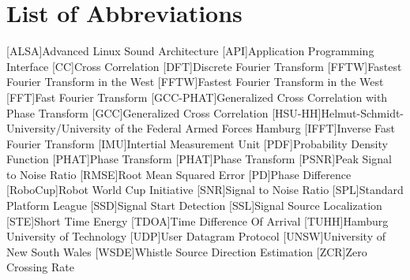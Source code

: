 \chapter*{List of Abbreviations}
\label{sec:abbreviations}

\begin{acronym}\itemsep0pt
  [ALSA]{Advanced Linux Sound Architecture}
  [API]{Application Programming Interface}
  [CC]{Cross Correlation}
  [DFT]{Discrete Fourier Transform}
  [FFTW]{Fastest Fourier Transform in the West}
  [FFTW]{Fastest Fourier Transform in the West}
  [FFT]{Fast Fourier Transform}
  [GCC-PHAT]{Generalized Cross Correlation with Phase Transform}
  [GCC]{Generalized Cross Correlation}
  [HSU-HH]{Helmut-Schmidt-University/University of the Federal Armed Forces Hamburg}
  [IFFT]{Inverse Fast Fourier Transform}
  [IMU]{Intertial Measurement Unit}
  [PDF]{Probability Density Function}
  [PHAT]{Phase Transform}
  [PHAT]{Phase Transform}
  [PSNR]{Peak Signal to Noise Ratio}
  [RMSE]{Root Mean Squared Error}
  [PD]{Phase Difference}
  [RoboCup]{Robot World Cup Initiative}
  [SNR]{Signal to Noise Ratio}
  [SPL]{Standard Platform League}
  [SSD]{Signal Start Detection}
  [SSL]{Signal Source Localization}
  [STE]{Short Time Energy}
  [TDOA]{Time Difference Of Arrival}
  [TUHH]{Hamburg University of Technology}
  [UDP]{User Datagram Protocol}
  [UNSW]{University of New South Wales}
  [WSDE]{Whistle Source Direction Estimation}
  [ZCR]{Zero Crossing Rate}
\end{acronym}
